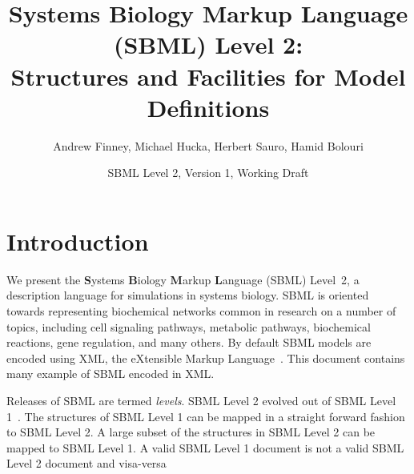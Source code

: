 \documentclass[10pt]{cekarticle}
\begin{document}

\title{Systems Biology Markup Language (SBML) Level 2:\\
  Structures and Facilities for Model Definitions}

\author{Andrew Finney, Michael Hucka, Herbert Sauro, Hamid Bolouri}


\address{Systems Biology Workbench Development Group\\
  ERATO Kitano Systems Biology Project\\
  Control and Dynamical Systems, MC 107-81\\
  California Institute of Technology, Pasadena, CA 91125, USA\\[3pt]
  \url{http://www.cds.caltech.edu/erato}}


\date{SBML Level 2, Version 1, Working Draft}

\maketitlepage


\section{Introduction}
\label{sec:introduction}

We present the \textbf{S}ystems \textbf{B}iology \textbf{M}arkup
\textbf{L}anguage (SBML) Level~2, a description language for
simulations in systems biology.  SBML is oriented towards
representing biochemical networks common in research on a number
of topics, including cell signaling pathways, metabolic pathways,
biochemical reactions, gene regulation, and many others.  By default SBML models are encoded using XML, the
eXtensible Markup Language~\citep{bosak:1999,bray:1998}.  This document contains many example of SBML encoded in XML.

Releases of SBML are termed \emph{levels}.  SBML Level 2 evolved out of
SBML Level 1~\citep{hucka:2001}.  The structures of SBML Level 1
can be mapped in a straight forward fashion to SBML Level 2.  A large
subset of the structures in SBML Level 2 can be mapped to SBML Level 1.
A valid SBML Level 1 document is not a valid SBML Level 2 document and visa-versa
\end{document}
